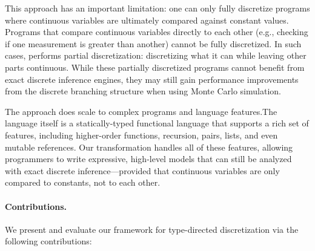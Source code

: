 This approach has an important limitation: one can only fully discretize programs where continuous variables are ultimately compared against constant values. Programs that compare continuous variables directly to each other (e.g., checking if one measurement is greater than another) cannot be fully discretized. In such cases, \Slice{} performs partial discretization: discretizing what it can while leaving other parts continuous. While these partially discretized programs cannot benefit from exact discrete inference engines, they may still gain performance improvements from the discrete branching structure when using Monte Carlo simulation.

The approach does scale to complex programs and language features.The \Slice{} language itself is a statically-typed functional language that supports a rich set of features, including higher-order functions, recursion, pairs, lists, and even mutable references. Our transformation handles all of these features, allowing programmers to write expressive, high-level models that can still be analyzed with exact discrete inference—provided that continuous variables are only compared to constants, not to each other.

\paragraph{Contributions.}
We present and evaluate our framework for type-directed discretization via the following contributions:

